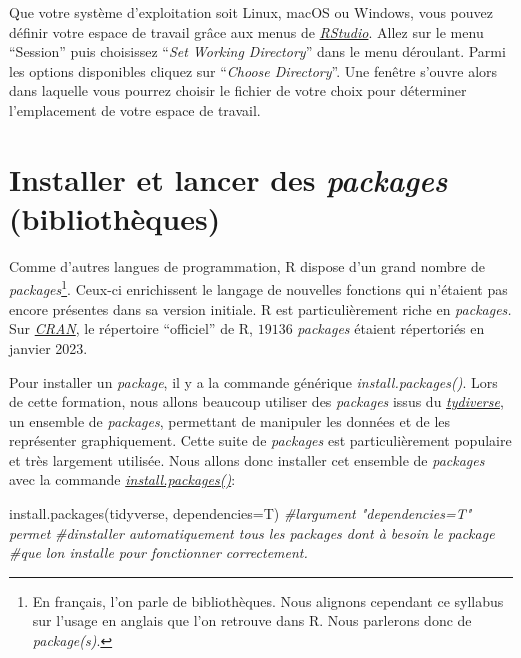 \documentclass[
]{book}
\newenvironment{Shaded}{\begin{snugshade}}{\end{snugshade}}
\newcommand{\AttributeTok}[1]{\textcolor[rgb]{0.77,0.63,0.00}{#1}}
\newcommand{\CommentTok}[1]{\textcolor[rgb]{0.56,0.35,0.01}{\textit{#1}}}
\newcommand{\FunctionTok}[1]{\textcolor[rgb]{0.00,0.00,0.00}{#1}}
\newcommand{\NormalTok}[1]{#1}
\begin{document}
Que votre système d'exploitation soit Linux, macOS ou Windows, vous pouvez définir votre espace de travail grâce aux menus de \href{https://posit.co/}{\emph{RStudio}}. Allez sur le menu ``Session'' puis choisissez ``\emph{Set Working Directory}'' dans le menu déroulant. Parmi les options disponibles cliquez sur ``\emph{Choose Directory}''. Une fenêtre s'ouvre alors dans laquelle vous pourrez choisir le fichier de votre choix pour déterminer l'emplacement de votre espace de travail.

\hypertarget{packages}{%
\section{\texorpdfstring{Installer et lancer des \emph{packages} (bibliothèques)}{Installer et lancer des packages (bibliothèques)}}\label{packages}}

Comme d'autres langues de programmation, R dispose d'un grand nombre de \emph{packages}\footnote{En français, l'on parle de bibliothèques. Nous alignons cependant ce syllabus sur l'usage en anglais que l'on retrouve dans R. Nous parlerons donc de \emph{package(s)}.}. Ceux-ci enrichissent le langage de nouvelles fonctions qui n'étaient pas encore présentes dans sa version initiale. R est particulièrement riche en \emph{packages.} Sur \href{https://cran.r-project.org/}{\emph{CRAN}}, le répertoire ``officiel'' de R, \(19136\) \emph{packages} étaient répertoriés en janvier 2023.

Pour installer un \emph{package}, il y a la commande générique \emph{install.packages()}. Lors de cette formation, nous allons beaucoup utiliser des \emph{packages} issus du \href{https://www.tidyverse.org/}{\emph{tydiverse}}, un ensemble de \emph{packages}, permettant de manipuler les données et de les représenter graphiquement. Cette suite de \emph{packages} est particulièrement populaire et très largement utilisée. Nous allons donc installer cet ensemble de \emph{packages} avec la commande \href{https://www.rdocumentation.org/packages/utils/versions/3.6.2/topics/install.packages}{\emph{install.packages()}}:

\begin{Shaded}
\begin{Highlighting}[]
\FunctionTok{install.packages}\NormalTok{(tidyverse, }\AttributeTok{dependencies=}\NormalTok{T) }\CommentTok{\#l\textquotesingle{}argument "dependencies=T" permet}
        \CommentTok{\#d\textquotesingle{}installer automatiquement tous les packages dont à besoin le package}
        \CommentTok{\#que l\textquotesingle{}on installe pour fonctionner correctement.}
\end{Highlighting}
\end{Shaded}
\end{document}
